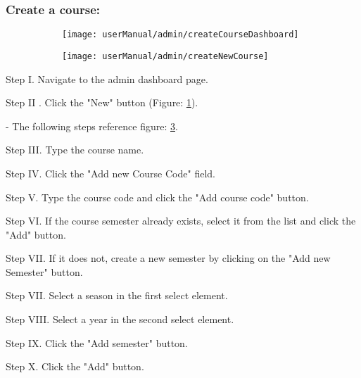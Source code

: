 \subsubsection{Create a course:}

\begin{figure}[H]
    \begin{subfigure}{0.45\linewidth}
        \centering
		\texttt{[image: userManual/admin/createCourseDashboard]}
		\caption{}
		\label{fig:createCourseDashboard}
    \end{subfigure}
    \hfill
    \begin{subfigure}{0.45\linewidth}
        \centering
		\texttt{[image: userManual/admin/createNewCourse]}
		\caption{}
		\label{fig:createNewCourse}
	\end{subfigure}
\end{figure}

\begin{userManualItemlist}
    \item[Step I.] Navigate to the admin dashboard page.
    \item[Step II]. Click the "New" button (Figure: \ref{fig:createCourseDashboard}).
    \item[-] The following steps reference figure: \ref{fig:createNewCourse}. 
    \item[Step III.] Type the course name.
    \item[Step IV.] Click the "Add new Course Code" field.
    \item[Step V.] Type the course code and click the "Add course code" button.
    \item[Step VI.] If the course semester already exists, select it from the list and click the "Add" button.
    \item[Step VII.] If it does not, create a new semester by clicking on the "Add new Semester" button.
    \item[Step VII.] Select a season in the first select element.
    \item[Step VIII.] Select a year in the second select element.
    \item[Step IX.] Click the "Add semester" button.
    \item[Step X.] Click the "Add" button.    
\end{userManualItemlist}